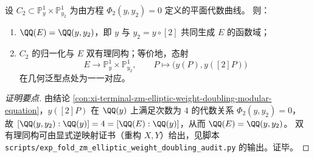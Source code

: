 \begin{conclusion}\label{con:xi-terminal-zm-elliptic-weight-doubling-function-field-reconstruction}
设 \(C_{2}\subset\mathbb P^{1}_{y}\times\mathbb P^{1}_{y_{2}}\) 为由方程 \(\Phi_{2}(y,y_{2})=0\) 定义的平面代数曲线。
则：
\begin{enumerate}
  \item \(\QQ(E)=\QQ(y,y_{2})\)，即 \(y\) 与 \(y_{2}=y\circ[2]\) 共同生成 \(E\) 的函数域；
  \item \(C_{2}\) 的归一化与 \(E\) 双有理同构；等价地，态射
  \[
  E\longrightarrow \mathbb P^{1}_{y}\times\mathbb P^{1}_{y_{2}},\qquad
  P\longmapsto\bigl(y(P),y([2]P)\bigr)
  \]
  在几何泛型点处为一一对应。
\end{enumerate}
\end{conclusion}
\begin{proof}[证明要点]
由结论 \ref{con:xi-terminal-zm-elliptic-weight-doubling-modular-equation}，\(y([2]P)\) 在 \(\QQ(y)\) 上满足次数为 \(4\) 的代数关系 \(\Phi_{2}(y,y_{2})=0\)，
故 \([\QQ(y,y_{2}):\QQ(y)]=4=[\QQ(E):\QQ(y)]\)，从而 \(\QQ(E)=\QQ(y,y_{2})\)。
双有理同构可由显式逆映射证书（重构 \(X,Y\)）给出，见脚本 \texttt{scripts/exp\_fold\_zm\_elliptic\_weight\_doubling\_audit.py} 的输出。证毕。
\end{proof}

